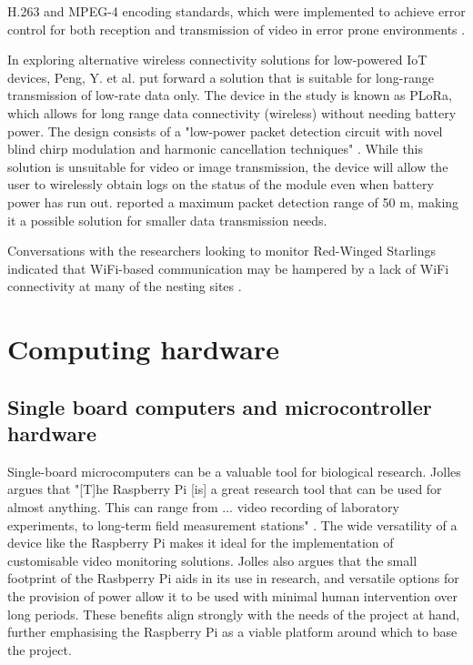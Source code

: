 \documentclass[class=report,11pt,crop=false]{standalone}
\begin{document}
\cite{adsumilli2002adaptive} H.263 and MPEG-4 encoding standards, which were implemented to achieve error control for both reception and transmission of video in error prone environments \cite{adsumilli2002adaptive}.

In exploring alternative wireless connectivity solutions for low-powered IoT devices, Peng, Y. et al. \cite{peng2018plora} put forward a solution that is suitable for long-range transmission of low-rate data only. The device in the study is known as PLoRa, which allows for long range data connectivity (wireless) without needing battery power. The design consists of a "low-power packet detection circuit with novel blind chirp modulation and harmonic cancellation techniques" \cite{peng2018plora}. While this solution is unsuitable for video or image transmission, the device will allow the user to wirelessly obtain logs on the status of the module even when battery power has run out. \cite{peng2018plora} reported a maximum packet detection range of 50 m, making it a possible solution for smaller data transmission needs. 

Conversations with the researchers looking to monitor Red-Winged Starlings indicated that WiFi-based communication may be hampered by a lack of WiFi connectivity at many of the nesting sites \cite{hofmeyer2024private}.

\section{Computing hardware}

\subsection{Single board computers and microcontroller hardware}

Single-board microcomputers can be a valuable tool for biological research. Jolles argues that "[T]he Raspberry Pi [is] a great research tool that can be used for almost anything. This can range from ... video recording of laboratory experiments, to long-term field measurement stations" \cite{jolles2021broad-scale}. The wide versatility of a device like the Raspberry Pi makes it ideal for the implementation of customisable video monitoring solutions. Jolles \cite{jolles2021broad-scale} also argues that the small footprint of the Rasbperry Pi aids in its use in research, and versatile options for the provision of power allow it to be used with minimal human intervention over long periods. These benefits align strongly with the needs of the project at hand, further emphasising the Raspberry Pi as a viable platform around which to base the project.
\end{document}
